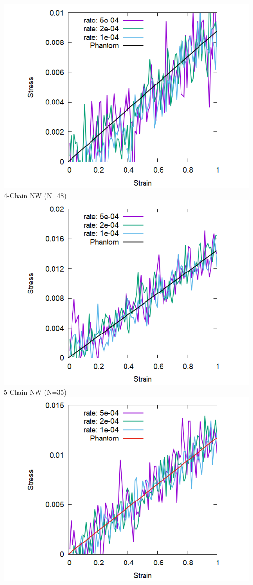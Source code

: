 \documentclass[12pt, dvipdfmx]{beamer}
\begin{document}
\begin{frame}
	\begin{columns}[T, onlytextwidth]
			\centering
			\includegraphics[width=\textwidth]{Shear_Random_4chain_N48.png}
			4-Chain NW (N=48)
		\centering
			\includegraphics[width=\textwidth]{Shear_Random_5chain_N35.png}
			5-Chain NW (N=35)
		\centering
		\includegraphics[width=\textwidth]{Shear_Random_6chain_N48.png}

\end{columns}
\end{frame}
\end{document}
